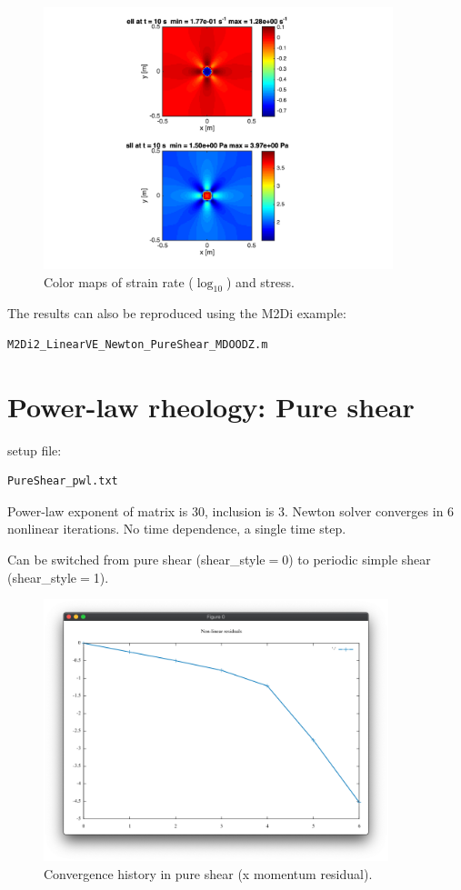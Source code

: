 \documentclass[12pt,english,openany]{scrbook}
\begin{document}
\begin{figure}[ht!]
\centerline{\includegraphics[height=3.0in]{./Figures/PureShear_VE_cmaps}}
\caption{Color maps of strain rate ($\log_{10}$) and stress.}
\label{PureShear_VE_cmapsl}
\end{figure}

The results can also be reproduced using the M2Di example:
\begin{verbatim} 
M2Di2_LinearVE_Newton_PureShear_MDOODZ.m
\end{verbatim}

\section{Power-law rheology: Pure shear}

setup file:
\begin{verbatim} 
PureShear_pwl.txt
\end{verbatim}

Power-law exponent of matrix is 30, inclusion is 3.
Newton solver converges in 6 nonlinear iterations.
No time dependence, a single time step.

Can be switched from pure shear (shear\_style$=$0) to periodic simple shear (shear\_style$=$1).

\begin{figure}[ht!]
\centerline{\includegraphics[height=3.0in]{./Figures/Shear_pwl_Convergence_PS_MDOODZ}}
\caption{Convergence history in pure shear (x momentum residual).}
\label{PureShear_pwl_cmaps}
\end{figure}
\end{document}
